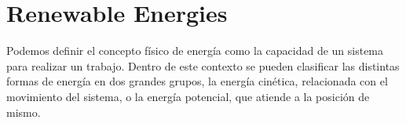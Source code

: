 





\section{Renewable Energies}

Podemos definir el concepto físico de energía como la capacidad de un sistema para realizar un trabajo. Dentro de este contexto se pueden clasificar las distintas formas de energía en dos grandes grupos, la energía cinética, relacionada con el movimiento del sistema, o la energía potencial, que atiende a la posición de mismo.

